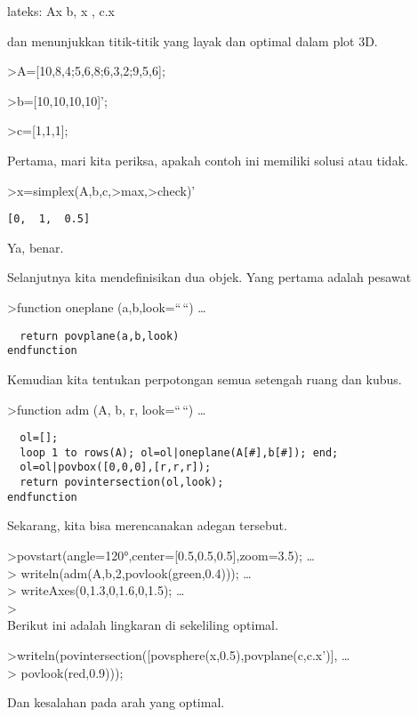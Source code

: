 \documentclass[
]{book}
\begin{document}
lateks: Ax \le b, \quad x , \quad c.x \to {}

dan menunjukkan titik-titik yang layak dan optimal dalam plot 3D.

\textgreater A={[}10,8,4;5,6,8;6,3,2;9,5,6{]};

\textgreater b={[}10,10,10,10{]}';

\textgreater c={[}1,1,1{]};

Pertama, mari kita periksa, apakah contoh ini memiliki solusi atau tidak.

\textgreater x=simplex(A,b,c,\textgreater max,\textgreater check)'

\begin{verbatim}
[0,  1,  0.5]
\end{verbatim}

Ya, benar.

Selanjutnya kita mendefinisikan dua objek. Yang pertama adalah pesawat

\textgreater function oneplane (a,b,look=``\,``) \ldots{}

\begin{verbatim}
  return povplane(a,b,look)
endfunction
\end{verbatim}

Kemudian kita tentukan perpotongan semua setengah ruang dan kubus.

\textgreater function adm (A, b, r, look=``\,``) \ldots{}

\begin{verbatim}
  ol=[];
  loop 1 to rows(A); ol=ol|oneplane(A[#],b[#]); end;
  ol=ol|povbox([0,0,0],[r,r,r]);
  return povintersection(ol,look);
endfunction
\end{verbatim}

Sekarang, kita bisa merencanakan adegan tersebut.

\textgreater povstart(angle=120°,center={[}0.5,0.5,0.5{]},zoom=3.5); \ldots{}\\
\textgreater{} writeln(adm(A,b,2,povlook(green,0.4))); \ldots{}\\
\textgreater{} writeAxes(0,1.3,0,1.6,0,1.5); \ldots{}\\
\textgreater{}\\
Berikut ini adalah lingkaran di sekeliling optimal.

\textgreater writeln(povintersection({[}povsphere(x,0.5),povplane(c,c.x'){]}, \ldots{}\\
\textgreater{} povlook(red,0.9)));

Dan kesalahan pada arah yang optimal.
\end{document}
